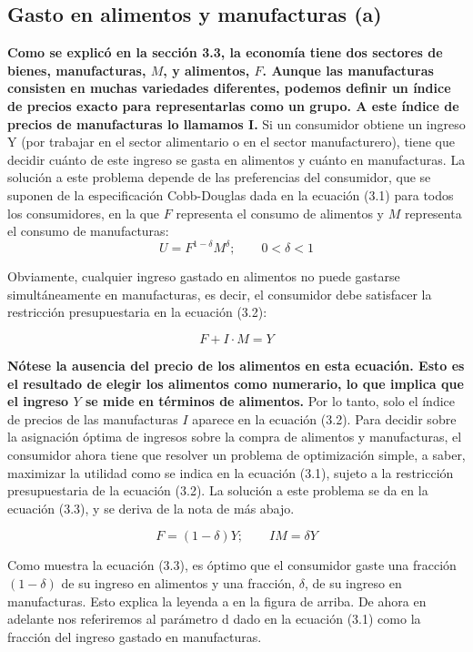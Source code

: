 \subsection{Gasto en alimentos y manufacturas (a)}
\textbf{Como se explicó en la sección 3.3, la economía tiene dos sectores de bienes, manufacturas, $M$, y alimentos, $F$. Aunque las manufacturas consisten en muchas variedades diferentes, podemos definir un índice de precios exacto para representarlas como un grupo. A este índice de precios de manufacturas lo llamamos I.} Si un consumidor obtiene un ingreso Y (por trabajar en el sector alimentario o en el sector manufacturero), tiene que decidir cuánto de este ingreso se gasta en alimentos y cuánto en manufacturas. La solución a este problema depende de las preferencias del consumidor, que se suponen de la especificación Cobb-Douglas dada en la ecuación (3.1) para todos los consumidores, en la que $F$ representa el consumo de alimentos y $M$ representa el consumo de manufacturas:
\begin{equation}
    U=F^{1-\delta} M^\delta;\qquad 0<\delta<1
\end{equation}

Obviamente, cualquier ingreso gastado en alimentos no puede gastarse simultáneamente en manufacturas, es decir, el consumidor debe satisfacer la restricción presupuestaria en la ecuación (3.2):

\begin{equation}
    F+I \cdot M=Y
\end{equation}

\textbf{Nótese la ausencia del precio de los alimentos en esta ecuación. Esto es el resultado de elegir los alimentos como numerario, lo que implica que el ingreso $Y$ se mide en términos de alimentos.} Por lo tanto, solo el índice de precios de las manufacturas $I$ aparece en la ecuación (3.2). Para decidir sobre la asignación óptima de ingresos sobre la compra de alimentos y manufacturas, el consumidor ahora tiene que resolver un problema de optimización simple, a saber, maximizar la utilidad como se indica en la ecuación (3.1), sujeto a la restricción presupuestaria de la ecuación (3.2). La solución a este problema se da en la ecuación (3.3), y se deriva de la nota de más abajo.

\begin{equation}
    F=(1-\delta)Y;\qquad IM=\delta Y
\end{equation}

Como muestra la ecuación (3.3), es óptimo que el consumidor gaste una fracción $(1 -\delta)$ de su ingreso en alimentos y una fracción, $\delta$, de su ingreso en manufacturas. Esto explica la leyenda a en la figura de arriba. De ahora en adelante nos referiremos al parámetro d dado en la ecuación (3.1) como la fracción del ingreso gastado en manufacturas.

